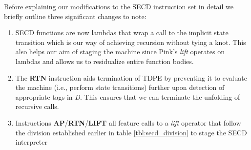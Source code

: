 \documentclass[a4paper,12pt,twoside,openright]{report}
\theoremstyle{definition}
\begin{document}
Before explaining our modifications to the SECD instruction set in detail we briefly outline three significant changes to note:
\begin{enumerate}
    \item SECD functions are now lambdas that wrap a call to the implicit state transition which is our way of achieving recursion without tying a knot. This also helps our aim of staging the machine since Pink's \textit{lift} operates on lambdas and allows us to residualize entire function bodies.
    \item The \textbf{RTN} instruction aids termination of TDPE by preventing it to evaluate the machine (i.e., perform state transitions) further upon detection of appropriate tags in \textit{D}. This ensures that we can terminate the unfolding of recursive calls.
    \item Instructions \textbf{AP}/\textbf{RTN}/\textbf{LIFT} all feature calls to a \textit{lift} operator that follow the division established earlier in table \ref{tbl:secd_division} to stage the SECD interpreter
\end{enumerate}
\end{document}
